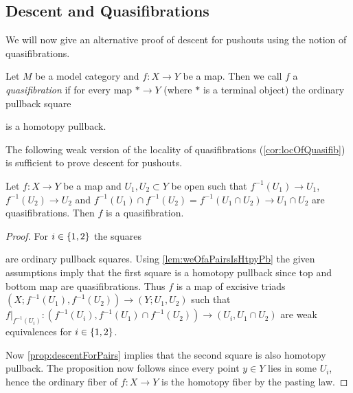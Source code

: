 \subsection*{Descent and Quasifibrations}
We will now give an alternative proof of descent for pushouts using the notion of quasifibrations.
\begin{definition}[Quasifibration]
    Let $M$ be a model category and $f\colon X\to Y$ be a map.
    Then we call $f$ a \emph{quasifibration} if for every map $*\to Y$ (where $*$ is a terminal object) the ordinary pullback square
    \begin{center}
    \end{center}
    is a homotopy pullback.
\end{definition}
The following weak version of the locality of quasifibrations (\cref{cor:locOfQuasifib}) is sufficient to prove descent for pushouts.
\begin{corollary}\label{cor:locOfQuasifib}
    Let $f\colon X\to Y$ be a map and $U_1, U_2\subset Y$ be open such that $f^{-1}(U_1)\to U_1$, $f^{-1}(U_2)\to U_2$ and $f^{-1}(U_1)\cap f^{-1}(U_2)=f^{-1}(U_1\cap U_2)\to U_1\cap U_2$ are quasifibrations.
    Then $f$ is a quasifibration.
    \begin{proof}
        For $i\in\left\lbrace1,2\right\rbrace$ the squares 
        \begin{center}
        \end{center} 
        are ordinary pullback squares.
        Using \cref{lem:weOfaPairsIsHtpyPb} the given assumptions imply that the first square is a homotopy pullback since top and bottom map are quasifibrations.
        Thus $f$ is a map of excisive triads $(X;f^{-1}(U_1),f^{-1}(U_2))\to(Y;U_1,U_2)$ such that $f|_{f^{-1}(U_i)}\colon(f^{-1}(U_i),f^{-1}(U_1)\cap f^{-1}(U_2))\to (U_i,U_1\cap U_2)$ are weak equivalences for $i\in\left\lbrace1,2\right\rbrace$.

        Now \cref{prop:descentForPairs} implies that the second square is also homotopy pullback.
        The proposition now follows since every point $y\in Y$ lies in some $U_i$, hence the ordinary fiber of $f\colon X\to Y$ is the homotopy fiber by the pasting law.
    \end{proof}
\end{corollary}
